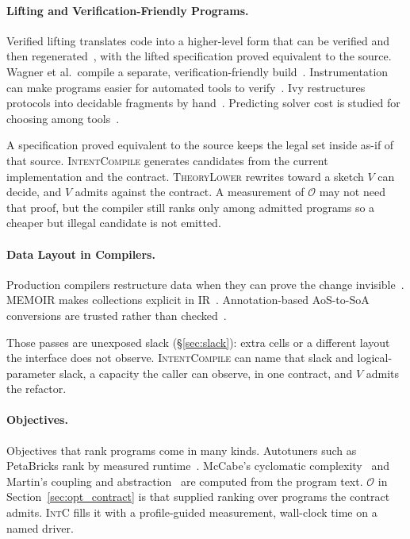 \paragraph{Lifting and Verification-Friendly Programs.}
Verified lifting translates code into a higher-level form that can be
verified and then regenerated~\cite{kamil2016stng,bhatia2024llmlift}, with
the lifted specification proved equivalent to the source. Wagner et al.\
compile a separate, verification-friendly build~\cite{wagner2013overify}.
Instrumentation can make programs easier for automated tools to
verify~\cite{amilon2023instrumentation}. Ivy restructures protocols into
decidable fragments by
hand~\cite{padon2016ivy,padon2017paxosepr}. Predicting solver cost is
studied for choosing among tools~\cite{healy2017where4,leeson2022graves}.

A specification proved equivalent to the source keeps the legal set inside
as-if of that source. \textsc{IntentCompile} generates candidates from the
current implementation and the contract. \textsc{TheoryLower} rewrites
toward a sketch \(V\) can decide, and \(V\) admits against the contract.
A measurement of \(\mathcal{O}\) may not need that proof, but the compiler
still ranks only among admitted programs so a cheaper but illegal candidate
is not emitted.

\paragraph{Data Layout in Compilers.}
Production compilers restructure data when they can prove the change
invisible~\cite{zhao2007forma,hundt2006practical,lattner2005pool}. MEMOIR
makes collections explicit in IR~\cite{mcmichen2024memoir}. Annotation-based
AoS-to-SoA conversions are trusted rather than
checked~\cite{radtke2025annotation}.

Those passes are unexposed slack (\S\ref{sec:slack}): extra cells or a
different layout the interface does not observe. \textsc{IntentCompile}
can name that slack and logical-parameter slack, a capacity the caller can
observe, in one contract, and \(V\) admits the refactor.

\paragraph{Objectives.}
Objectives that rank programs come in many kinds. Autotuners such as
PetaBricks rank by measured
runtime~\cite{ansel2009petabricks}. McCabe's cyclomatic
complexity~\cite{mccabe1976complexity} and Martin's coupling and
abstraction~\cite{martin2000design} are computed from the program text.
\(\mathcal{O}\) in Section~\ref{sec:opt_contract} is that supplied ranking
over programs the contract admits. \textsc{IntC} fills it with a
profile-guided measurement, wall-clock time on a named driver.
